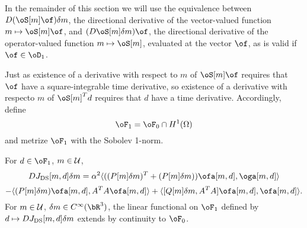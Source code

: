 In the remainder of this section we will use the equivalence between $D(\oS[m]\of)\delta
m$, the directional derivative of the vector-valued function $m
\mapsto \oS[m]\of$,  and $(D\oS[m]\delta m)\of$, the directional
derivative of the operator-valued function $m \mapsto \oS[m]$,
evaluated at the vector $\of$, as is valid if $\of \in \oD_1$.

Just as existence of a derivative with respect to $m$ of $\oS[m]\of$
requires that $\of$ have a square-integrable time derivative, so
existence of a derivative with respecto $m$ of $\oS[m]^Td$ requires
that $d$ have a time derivative. Accordingly, define
\[
\oF_1 = \oF_0 \cap H^1(\Omega)
\]
and metrize $\oF_1$ with the Sobolev 1-norm.

\begin{theorem}
\label{thm:qcomm}
For $d \in \oF_1$, $m \in {\cal U}$,
\[
DJ_{\rm DS}[m,d]\delta m =\alpha^2 \langle ((P[m]\delta m)^T +(P[m]\delta
m))\ofa[m,d],\oga[m,d]\rangle 
\]
\begin{equation}
\label{eqn:qderiv}
-\langle (P[m]\delta
m)\ofa[m,d],A^TA\ofa[m,d]\rangle + \langle [Q[m]\delta m,A^TA]\ofa[m,d],\ofa[m,d]\rangle.
\end{equation}
For $m \in {\cal U}$, $\delta m \in C^{\infty}(\bR^3)$, the linear
functional on $\oF_1$ defined by $d \mapsto DJ_{\rm DS}[m,d]\delta m$
extends by continuity to $\oF_0$.
\end{theorem}
